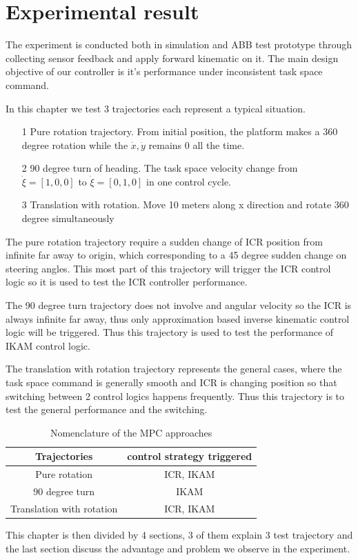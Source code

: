 \chapter{Experimental result}
\label{cha:experiment}
 The experiment is conducted both in simulation and ABB test prototype through collecting sensor feedback and apply forward kinematic on it.
The main design objective of our controller is it's performance under inconsistent task space command. 

In this chapter we test 3 trajectories each represent a typical situation. 
\begin{itemize}
    \item[1] Pure rotation trajectory. From initial position, the platform makes a 360 degree rotation while the $\dot{x},\dot{y}$ remains 0 all the time.
    \item[2] 90 degree turn of heading. The task space velocity change from $\dot{\xi}=[1,0,0]$ to $\dot{\xi}=[0,1,0]$ in one control cycle.
    \item[3] Translation with rotation. Move 10 meters along x direction and rotate 360 degree simultaneously
\end{itemize}
The pure rotation trajectory require a sudden change of ICR position from infinite far away to origin, which corresponding to a 45 degree sudden change on steering angles. This most part of this trajectory will trigger the ICR control logic so it is used to test the ICR controller performance.

The 90 degree turn trajectory does not involve and angular velocity so the ICR is always infinite far away, thus only approximation based inverse kinematic control logic will be triggered. Thus this trajectory is used to test the performance of IKAM control logic.

The translation with rotation trajectory represents the general cases, where the task space command is generally smooth and ICR is changing position so that switching between 2 control logics happens frequently. Thus this trajectory is to test the general performance and the switching.
\begin{table}[b]
	\centering
		\begin{tabular}{cc}
		Trajectories   &  control strategy triggered                  \\\midrule
		Pure rotation          &  ICR, IKAM     \\
		90 degree turn          &  IKAM              \\
		Translation with rotation      &  ICR, IKAM              \\\bottomrule
		\end{tabular}
		\vspace{1mm}
	\caption{Nomenclature of the MPC approaches}
	\label{tab:testTrajectory}
\end{table}
This chapter is then divided by 4 sections, 3 of them explain 3 test trajectory and the last section discuss the advantage and problem we observe in the experiment.

